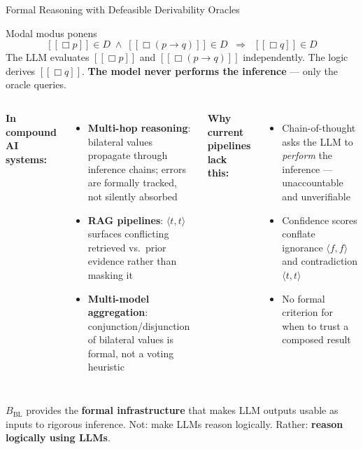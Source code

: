 \documentclass[aspectratio=169,9pt]{beamer}
\newcommand{\tv}[2]{\langle #1,#2 \rangle}
\newcommand{\BBL}{{B_{\mathrm{BL}}}}
\begin{document}
\begin{frame}{Formal Reasoning with Defeasible Derivability Oracles}

  \begin{block}{Modal modus ponens}
    \[
      [\![\Box p]\!] \in D \;\wedge\; [\![\Box(p \to q)]\!] \in D
      \;\;\Longrightarrow\;\;
      [\![\Box q]\!] \in D
    \]
    The LLM evaluates $[\![\Box p]\!]$ and $[\![\Box(p{\to}q)]\!]$ independently.
    The logic derives $[\![\Box q]\!]$.
    \textbf{The model never performs the inference} — only the oracle queries.
  \end{block}

  \medskip

  \small
  \begin{columns}[T]
    \textbf{In compound AI systems:}
    \begin{itemize}\setlength\itemsep{3pt}
      \item \textbf{Multi-hop reasoning}: bilateral values propagate through
            inference chains; errors are formally tracked, not silently absorbed
      \item \textbf{RAG pipelines}: $\tv{t}{t}$ surfaces conflicting
            retrieved vs.\ prior evidence rather than masking it
      \item \textbf{Multi-model aggregation}: conjunction/disjunction of
            bilateral values is formal, not a voting heuristic
    \end{itemize}

    \textbf{Why current pipelines lack this:}
    \begin{itemize}\setlength\itemsep{3pt}
      \item Chain-of-thought asks the LLM to \emph{perform} the inference
            — unaccountable and unverifiable
      \item Confidence scores conflate ignorance $\tv{f}{f}$
            and contradiction $\tv{t}{t}$
      \item No formal criterion for when to trust a composed result
    \end{itemize}
  \end{columns}

  \medskip\pause
  \small
  $\BBL$ provides the \textbf{formal infrastructure} that makes LLM outputs usable
  as inputs to rigorous inference.
  Not: make LLMs reason logically. Rather: \textbf{reason logically using LLMs}.

\end{frame}
\end{document}
